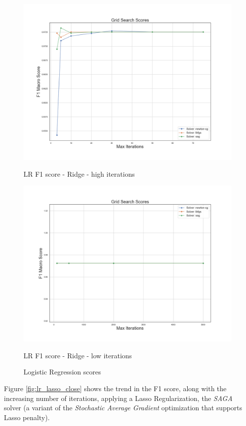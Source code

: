 \begin{figure}
\begin{multicols}{2}
		\includegraphics[width=\linewidth]{chapter5/figure/logreg_l2_close.png}\par 
		\caption{LR F1 score - Ridge - high iterations}
		\label{fig:lr_ridge_close}
		\includegraphics[width=\linewidth]{chapter5/figure/logreg_l2_far.png}\par 
		\caption{LR F1 score - Ridge - low iterations}
		\label{fig:lr_ridge_far}
	\end{multicols}
	\caption{Logistic Regression scores}
\end{figure}
Figure \ref{fig:lr_lasso_close} shows the trend in the F1 score, along with the increasing number of iterations, applying a Lasso Regularization, the \textit{SAGA}\cite{SAGA} solver (a variant of the \textit{Stochastic Average Gradient}\cite{SAG} optimization that supports Lasso penalty).
